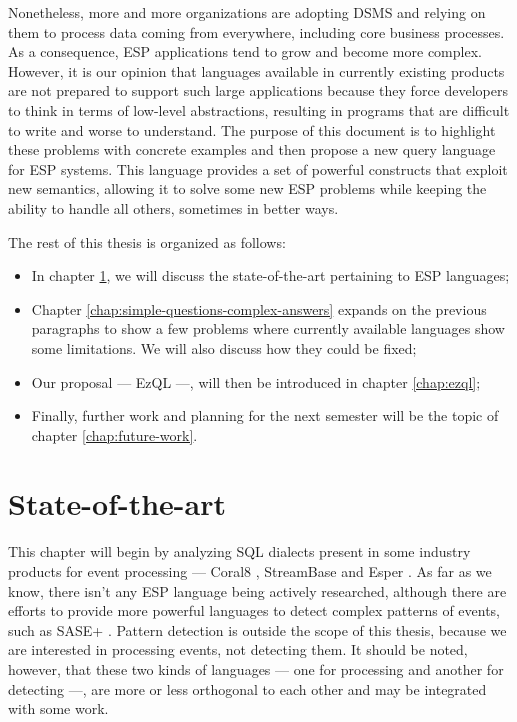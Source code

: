 \documentclass[a4,11pt]{report}
\begin{document}
Nonetheless, more and more organizations are adopting DSMS and relying
on them to process data coming from everywhere, including core
business processes. As a consequence, ESP applications tend to grow
and become more complex. However, it is our opinion that languages
available in currently existing products are not prepared to support
such large applications because they force developers to think in
terms of low-level abstractions, resulting in programs that are
difficult to write and worse to understand. The purpose of this
document is to highlight these problems with concrete examples and
then propose a new query language for ESP systems. This language
provides a set of powerful constructs that exploit new semantics,
allowing it to solve some new ESP problems while keeping the ability
to handle all others, sometimes in better ways.

The rest of this thesis is organized as follows:

\begin{itemize}
\item In chapter \ref{chap:soa}, we will discuss the state-of-the-art
  pertaining to ESP languages;
\item Chapter \ref{chap:simple-questions-complex-answers} expands on
  the previous paragraphs to show a few problems where currently
  available languages show some limitations. We will also discuss how
  they could be fixed;
\item Our proposal --- EzQL ---, will then be introduced in chapter
  \ref{chap:ezql};
\item Finally, further work and planning for the next semester will be
  the topic of chapter \ref{chap:future-work}.
\end{itemize}

\chapter{State-of-the-art}
\label{chap:soa}

This chapter will begin by analyzing SQL dialects present in some
industry products for event processing --- Coral8 \cite{coral8:www},
StreamBase \cite{streambase:www} and Esper \cite{esper:www}. As far as
we know, there isn't any ESP language being actively researched,
although there are efforts to provide more powerful languages to
detect complex patterns of events, such as SASE+ \cite{SASE+}. Pattern
detection is outside the scope of this thesis, because we are
interested in processing events, not detecting them. It should be
noted, however, that these two kinds of languages --- one for
processing and another for detecting ---, are more or less orthogonal
to each other and may be integrated with some work.
\end{document}
